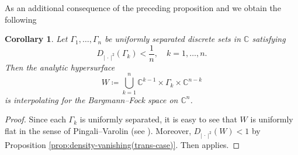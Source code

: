 \documentclass[12pt,a4paper]{amsart}
\numberwithin{equation}{section}
\newtheorem{corollary}[theorem]{Corollary}
\theoremstyle{definition}
\begin{document}
As an additional consequence of the preceding proposition and \cite[Theorem 1]{PV_Crelle16} we obtain the following
\begin{corollary}
Let $\Gamma_1,\ldots, \Gamma_n$ be uniformly separated discrete sets in $\mathbb C$ satisfying
  $$
  D_{|\,\cdot\,|^2}(\Gamma_k)<\frac 1n, \quad k=1,\ldots, n.
  $$
Then the analytic hypersurface
  $$
  W\coloneqq \bigcup_{k=1}^n \mathbb C^{k-1}\times\Gamma_k\times\mathbb C^{n-k}
  $$
is interpolating for the Bargmann--Fock space on $\mathbb C^n$.
\end{corollary}


\begin{proof}
Since each $\Gamma_k$ is uniformly separated, it is easy to see that $W$ is uniformly flat in the sense of Pingali--Varolin (see \cite[Definition 2.4]{PV_Crelle16}). Moreover, $D_{|\,\cdot\,|^2}(W)<1$ by Proposition \ref{prop:density-vanishing(trans-case)}. Then \cite[Theorem 1]{PV_Crelle16} applies.
\end{proof}



\bigskip
\end{document}
